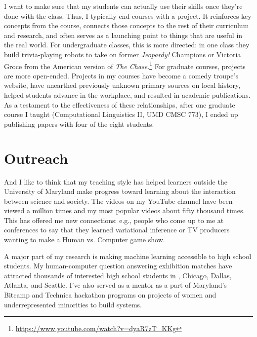 I want to make sure that my students can actually use their skills
once they're done with the class.  Thus, I typically end courses with
a project.  It reinforces key concepts from the course, connects those
concepts to the rest of their curriculum and research, and often
serves as a launching point to things that are useful in the real
world.  For undergraduate classes, this is more directed: in one class
they build trivia-playing robots to take on former \textit{Jeopardy!} Champions
or Victoria Groce from the American version of \textit{The
  Chase}.\footnote{\href{https://www.youtube.com/watch?v=dyaR7zT_KKg}{https://www.youtube.com/watch?v=dyaR7zT\_KKg}}  For
graduate courses, projects are more open-ended.  Projects in my
courses have become a comedy troupe's website, have unearthed
previously unknown primary sources on local history, helped students
advance in the workplace, and resulted in academic publications.  As a
testament to the effectiveness of these relationships, after one
graduate course I taught (Computational Linguistics II, UMD CMSC 773),
I ended up publishing papers with four of the eight students.


\section{Outreach}

And I like to think that my teaching style has helped learners outside
the University of Maryland make progress toward learning about the
interaction between science and society.  The videos on my YouTube
channel have been viewed a million times and my most popular videos
about fifty thousand times.  This has offered me new connections:
e.g., people who come up to me at conferences to say that they learned
variational inference or TV producers wanting to make a Human
vs. Computer game show.

A major part of my research is making machine learning accessible to
high school students.
%
My human-computer question answering exhibition matches have attracted
thousands of interested high school students in , Chicago,
Dallas, Atlanta, and Seattle.
%
I've also served as a mentor as a part of Maryland's Bitcamp and
Technica hackathon programs on projects of women and underrepresented
minorities to build  systems.


